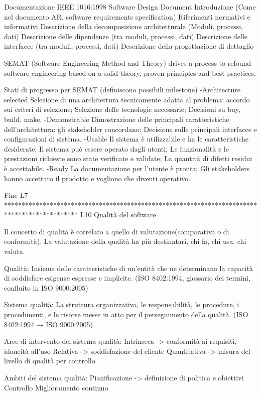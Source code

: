 \documentclass{report}
\begin{document}
Documentazione
IEEE 1016:1998 Software Design Document
Introduzione (Come nel documento AR, software requirements specification)
Riferimenti normativi e informativi
Descrizione della decomposizione architetturale (Moduli, processi, dati)
Descrizione delle dipendenze (tra moduli, processi, dati)
Descrizione delle interfacce (tra moduli, processi, dati)
Descrizione della progettazione di dettaglio


SEMAT (Software Engineering Method and Theory) drives a process to refound software engineering based on a solid theory, proven principles and best practices.

Stati di progresso per SEMAT (definiscono possibili milestone)
-Architecture selected
 Selezione di una architettura tecnicamente adatta al problema:
  accordo sui criteri di selezione;
  Selezione delle tecnologie necessarie;
  Decisioni su buy, build, make.
-Demonstrable
 Dimostrazione delle principali caratteristiche dell’architettura: gli stakeholder concordano;
 Decisione sulle principali interfacce e configurazioni di sistema.
-Usable
 Il sistema è utilizzabile e ha le caratteristiche desiderate;
 Il sistema può essere operato dagli utenti;
 Le funzionalità e le prestazioni richieste sono state verificate e validate;
 La quantità di difetti residui è accettabile.
-Ready
 La documentazione per l’utente è pronta;
 Gli stakeholders hanno accettato il prodotto e vogliono che diventi operativo.

Fine L7 
*********************************************************************************************
L10 Qualità del software 

Il concetto di qualità è correlato a quello di valutazione(comparativa o di conformità).
La valutazione della qualità ha più destinatari, chi fa, chi usa, chi valuta.

Qualità: Insieme delle caratteristiche di un'entità che ne determinano la capacità di soddisfare esigenze espresse e implicite.
(ISO 8402:1994, glossario dei termini, confluito in ISO 9000:2005)

Sistema qualità: La struttura organizzativa, le responsabilità, le procedure, i procedimenti, e le risorse messe in atto per il perseguimento della qualità. (ISO 8402:1994 → ISO 9000:2005)

Aree di intervento del sistema qualità:
Intrinseca -> conformità ai requisiti, idoneità all'uso
Relativa -> soddisfazione del cliente
Quantitativa -> misura del livello di qualità per controllo

Ambiti del sistema qualità:
Pianificazione -> definizione di politica e obiettivi
Controllo
Miglioramento continuo
\end{document}
